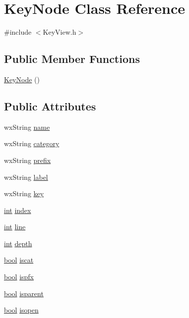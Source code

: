 \hypertarget{class_key_node}{}\section{Key\+Node Class Reference}
\label{class_key_node}


{\ttfamily \#include $<$Key\+View.\+h$>$}

\subsection*{Public Member Functions}
\begin{DoxyCompactItemize}
\item 
\hyperlink{class_key_node_a1cf1be6da2550c9ac172b966dc4eff82}{Key\+Node} ()
\end{DoxyCompactItemize}
\subsection*{Public Attributes}
\begin{DoxyCompactItemize}
\item 
wx\+String \hyperlink{class_key_node_aa4f39178ff49fceb6b1f1882aa9f5db5}{name}
\item 
wx\+String \hyperlink{class_key_node_a9e0e130ff90e69b8123edf3193632ab7}{category}
\item 
wx\+String \hyperlink{class_key_node_ad7f0ad2f83e1adc8135d0e539fadca87}{prefix}
\item 
wx\+String \hyperlink{class_key_node_a2b822fe077db30c7aa9b7614d5dc7d4d}{label}
\item 
wx\+String \hyperlink{class_key_node_a6c7cfedf027aa5f0dc8d5312ede8df73}{key}
\item 
\hyperlink{xmltok_8h_a5a0d4a5641ce434f1d23533f2b2e6653}{int} \hyperlink{class_key_node_a910a9b97cd2822291152ec789a8fc62e}{index}
\item 
\hyperlink{xmltok_8h_a5a0d4a5641ce434f1d23533f2b2e6653}{int} \hyperlink{class_key_node_afcac12846f195ed3b2ce7ac44775c4ce}{line}
\item 
\hyperlink{xmltok_8h_a5a0d4a5641ce434f1d23533f2b2e6653}{int} \hyperlink{class_key_node_a188a74b1405f2550a0bf378c7b3967aa}{depth}
\item 
\hyperlink{mac_2config_2i386_2lib-src_2libsoxr_2soxr-config_8h_abb452686968e48b67397da5f97445f5b}{bool} \hyperlink{class_key_node_a6d4ab2121d810e67dda185ca8eb332f6}{iscat}
\item 
\hyperlink{mac_2config_2i386_2lib-src_2libsoxr_2soxr-config_8h_abb452686968e48b67397da5f97445f5b}{bool} \hyperlink{class_key_node_abfc291ad3728582c410dafe5796510cb}{ispfx}
\item 
\hyperlink{mac_2config_2i386_2lib-src_2libsoxr_2soxr-config_8h_abb452686968e48b67397da5f97445f5b}{bool} \hyperlink{class_key_node_a69342299c1d68228d07fceb86832d906}{isparent}
\item 
\hyperlink{mac_2config_2i386_2lib-src_2libsoxr_2soxr-config_8h_abb452686968e48b67397da5f97445f5b}{bool} \hyperlink{class_key_node_a1bb8cd14f36cf902ddbee9de7320d9fd}{isopen}
\end{DoxyCompactItemize}


